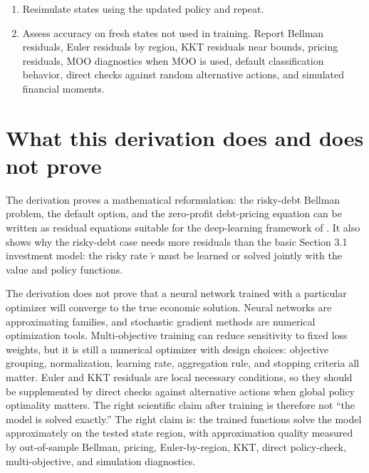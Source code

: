 \documentclass[11pt]{article}
\newcommand{\1}{\mathbf{1}}
\begin{document}
\begin{enumerate}[leftmargin=2em]
  \item Resimulate states using the updated policy and repeat.

  \item Assess accuracy on fresh states not used in training. Report Bellman
  residuals, Euler residuals by region, KKT residuals near bounds, pricing
  residuals, MOO diagnostics when MOO is used, default classification behavior,
  direct checks against random alternative actions, and simulated financial
  moments.
\end{enumerate}

\section{What this derivation does and does not prove}

The derivation proves a mathematical reformulation: the risky-debt Bellman
problem, the default option, and the zero-profit debt-pricing equation can be
written as residual equations suitable for the deep-learning framework of
\citet{maliar2021deep}. It also shows why the risky-debt case needs more
residuals than the basic Section 3.1 investment model: the risky rate
\(\widetilde r\) must be learned or solved jointly with the value and policy
functions.

The derivation does not prove that a neural network trained with a particular
optimizer will converge to the true economic solution. Neural networks are
approximating families, and stochastic gradient methods are numerical
optimization tools. Multi-objective training can reduce sensitivity to fixed
loss weights, but it is still a numerical optimizer with design choices:
objective grouping, normalization, learning rate, aggregation rule, and stopping
criteria all matter. Euler and KKT residuals are local necessary conditions, so
they should be supplemented by direct checks against alternative actions when
global policy optimality matters. The right scientific claim after training is
therefore not ``the model is solved exactly.'' The right claim is: the trained
functions solve the model approximately on the tested state region, with
approximation quality measured by out-of-sample Bellman, pricing,
Euler-by-region, KKT, direct policy-check, multi-objective, and simulation
diagnostics.
\end{document}
